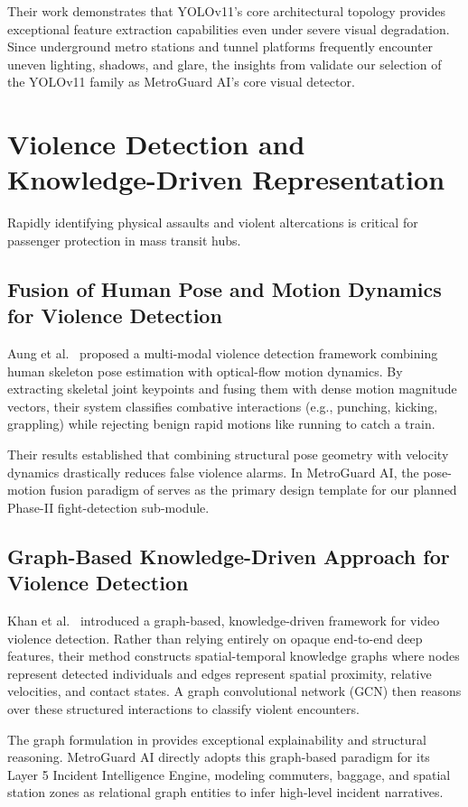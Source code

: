 \documentclass[12pt,a4paper]{report}
\begin{document}
Their work demonstrates that YOLOv11's core architectural topology provides exceptional feature extraction capabilities even under severe visual degradation. Since underground metro stations and tunnel platforms frequently encounter uneven lighting, shadows, and glare, the insights from \cite{p19} validate our selection of the YOLOv11 family as MetroGuard AI's core visual detector.

\section{Violence Detection and Knowledge-Driven Representation}
Rapidly identifying physical assaults and violent altercations is critical for passenger protection in mass transit hubs.

\subsection{Fusion of Human Pose and Motion Dynamics for Violence Detection}
Aung et al.\ \cite{p8} proposed a multi-modal violence detection framework combining human skeleton pose estimation with optical-flow motion dynamics. By extracting skeletal joint keypoints and fusing them with dense motion magnitude vectors, their system classifies combative interactions (e.g., punching, kicking, grappling) while rejecting benign rapid motions like running to catch a train.

Their results established that combining structural pose geometry with velocity dynamics drastically reduces false violence alarms. In MetroGuard AI, the pose-motion fusion paradigm of \cite{p8} serves as the primary design template for our planned Phase-II fight-detection sub-module.

\subsection{Graph-Based Knowledge-Driven Approach for Violence Detection}
Khan et al.\ \cite{p11} introduced a graph-based, knowledge-driven framework for video violence detection. Rather than relying entirely on opaque end-to-end deep features, their method constructs spatial-temporal knowledge graphs where nodes represent detected individuals and edges represent spatial proximity, relative velocities, and contact states. A graph convolutional network (GCN) then reasons over these structured interactions to classify violent encounters.

The graph formulation in \cite{p11} provides exceptional explainability and structural reasoning. MetroGuard AI directly adopts this graph-based paradigm for its Layer 5 Incident Intelligence Engine, modeling commuters, baggage, and spatial station zones as relational graph entities to infer high-level incident narratives.
\end{document}
